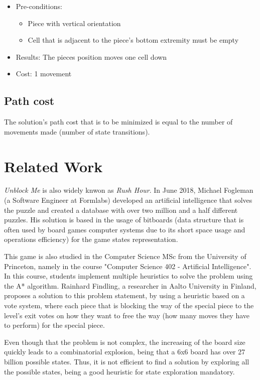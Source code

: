 \documentclass[conference]{IEEEtran}
\begin{document}
\begin{itemize}
    \begin{itemize}
        \item Pre-conditions:
        \begin{itemize}
            \item Piece with vertical orientation
            \item Cell that is adjacent to the piece's bottom extremity must be empty
        \end{itemize}
        \item Results: The pieces position moves one cell down
        \item Cost: 1 movement
    \end{itemize}
\end{itemize}

\subsection{Path cost}
The solution's path cost that is to be minimized is equal to the number of movements made (number of state transitions).


\section{Related Work}
\textit{Unblock Me} is also widely knwon as \textit{Rush Hour}. In June 2018, Michael Fogleman (a Software Engineer at Formlabs) developed an artificial intelligence that solves the puzzle and created a database with over two million and a half different puzzles\cite{b2}. His solution is based in the usage of bitboards\cite{b3} (data structure that is often used by board games computer systems due to its short space usage and operations efficiency) for the game states representation. 

This game is also studied in the Computer Science MSc from the University of Princeton, namely in the course "Computer Science 402 - Artificial Intelligence". In this course, students implement multiple heuristics to solve the problem using the A* algorithm\cite{b4}. Rainhard Findling, a researcher in Aalto University in Finland, proposes a solution to this problem statement, by using a heuristic based on a vote system, where each piece that is blocking the way of the special piece to the level's exit votes on how they want to free the way (how many moves they have to perform) for the special piece\cite{b5}. 

Even though that the problem is not complex, the increasing of the board size quickly leads to a combinatorial explosion, being that a 6x6 board has over 27 billion possible states. Thus, it is not efficient to find a solution by exploring all the possible states, being a good heuristic for state exploration mandatory.
\end{document}
